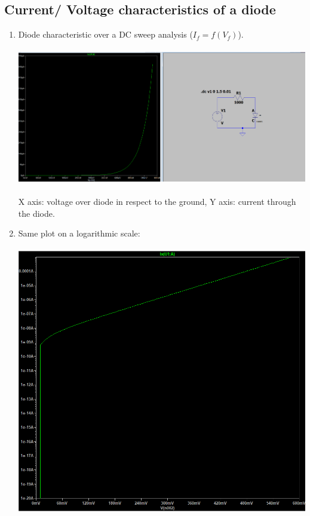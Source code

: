\documentclass{article}
\begin{document}
		\subsection{Current/ Voltage characteristics of a diode}
			\begin{enumerate}
				\item Diode characteristic over a DC sweep analysis (\(I_f = f(V_f)\)).\\\\
				\includegraphics[scale=0.35]{prelab/problem 1 - 1}\\\\
				X axis: voltage over diode in respect to the ground, Y axis: current through the diode.\\
				\item Same plot on a logarithmic scale:\\\\
				\includegraphics[scale=0.35]{prelab/problem 1 - 2}\\\\

\end{enumerate}
\end{document}

